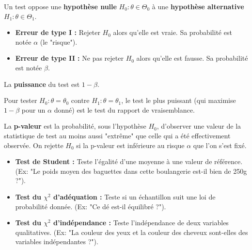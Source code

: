 \begin{definition}
    Un test oppose une \textbf{hypothèse nulle} $H_0: \theta \in \Theta_0$ à une \textbf{hypothèse alternative} $H_1: \theta \in \Theta_1$.
    \begin{itemize}
        \item \textbf{Erreur de type I :} Rejeter $H_0$ alors qu'elle est vraie. Sa probabilité est notée $\alpha$ (le "risque").
        \item \textbf{Erreur de type II :} Ne pas rejeter $H_0$ alors qu'elle est fausse. Sa probabilité est notée $\beta$.
    \end{itemize}
    La \textbf{puissance} du test est $1-\beta$.
\end{definition}

\begin{lemma}
    Pour tester $H_0: \theta=\theta_0$ contre $H_1: \theta=\theta_1$, le test le plus puissant (qui maximise $1-\beta$ pour un $\alpha$ donné) est le test du rapport de vraisemblance.
\end{lemma}

\begin{definition}[p-valeur]
    La \textbf{p-valeur} est la probabilité, sous l'hypothèse $H_0$, d'observer une valeur de la statistique de test au moins aussi "extrême" que celle qui a été effectivement observée. On rejette $H_0$ si la p-valeur est inférieure au risque $\alpha$ que l'on s'est fixé.
\end{definition}

\begin{application}
    \begin{itemize}
        \item \textbf{Test de Student :} Teste l'égalité d'une moyenne à une valeur de référence. (Ex: "Le poids moyen des baguettes dans cette boulangerie est-il bien de 250g ?").
        \item \textbf{Test du $\chi^2$ d'adéquation :} Teste si un échantillon suit une loi de probabilité donnée. (Ex: "Ce dé est-il équilibré ?").
        \item \textbf{Test du $\chi^2$ d'indépendance :} Teste l'indépendance de deux variables qualitatives. (Ex: "La couleur des yeux et la couleur des cheveux sont-elles des variables indépendantes ?").
    \end{itemize}
\end{application}